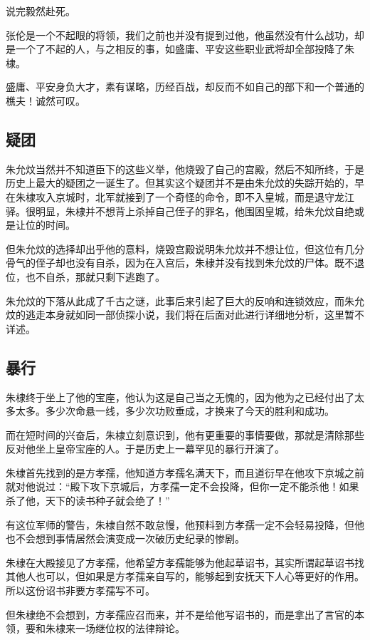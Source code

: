 \begin{multicols}{\theparacolNo}
		说完毅然赴死。

		张伦是一个不起眼的将领，我们之前也并没有提到过他，他虽然没有什么战功，却是一个了不起的人，与之相反的事，如盛庸、平安这些职业武将却全部投降了朱棣。

		盛庸、平安身负大才，素有谋略，历经百战，却反而不如自己的部下和一个普通的樵夫！诚然可叹。

		\subsection{疑团}
		朱允炆当然并不知道臣下的这些义举，他烧毁了自己的宫殿，然后不知所终，于是历史上最大的疑团之一诞生了。但其实这个疑团并不是由朱允炆的失踪开始的，早在朱棣攻入京城时，北军就接到了一个奇怪的命令，即不入皇城，而是退守龙江驿。很明显，朱棣并不想背上杀掉自己侄子的罪名，他围困皇城，给朱允炆自绝或是让位的时间。

		但朱允炆的选择却出乎他的意料，烧毁宫殿说明朱允炆并不想让位，但这位有几分骨气的侄子却也没有自杀，因为在入宫后，朱棣并没有找到朱允炆的尸体。既不退位，也不自杀，那就只剩下逃跑了。

		朱允炆的下落从此成了千古之谜，此事后来引起了巨大的反响和连锁效应，而朱允炆的逃走本身就如同一部侦探小说，我们将在后面对此进行详细地分析，这里暂不详述。

		\subsection{暴行}
		朱棣终于坐上了他的宝座，他认为这是自己当之无愧的，因为他为之已经付出了太多太多。多少次命悬一线，多少次功败垂成，才换来了今天的胜利和成功。

		而在短时间的兴奋后，朱棣立刻意识到，他有更重要的事情要做，那就是清除那些反对他坐上皇帝宝座的人。于是历史上一幕罕见的暴行开演了。

		朱棣首先找到的是方孝孺，他知道方孝孺名满天下，而且道衍早在他攻下京城之前就对他说过：“殿下攻下京城后，方孝孺一定不会投降，但你一定不能杀他！如果杀了他，天下的读书种子就会绝了！”

		有这位军师的警告，朱棣自然不敢怠慢，他预料到方孝孺一定不会轻易投降，但他也不会想到事情居然会演变成一次破历史纪录的惨剧。

		朱棣在大殿接见了方孝孺，他希望方孝孺能够为他起草诏书，其实所谓起草诏书找其他人也可以，但如果是方孝孺亲自写的，能够起到安抚天下人心等更好的作用。所以这份诏书非要方孝孺写不可。

		但朱棣绝不会想到，方孝孺应召而来，并不是给他写诏书的，而是拿出了言官的本领，要和朱棣来一场继位权的法律辩论。


\end{multicols}
